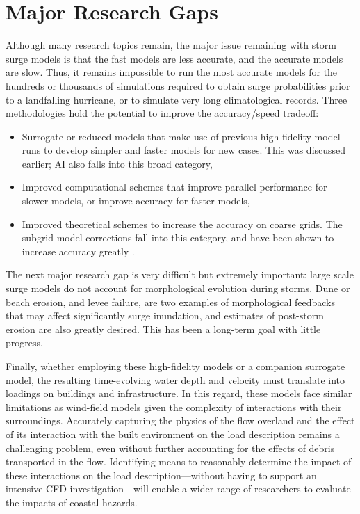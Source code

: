 \section{Major Research Gaps}
\label{sec:storm_surge_gaps}

Although many research topics remain, the major issue remaining with storm surge models is that the fast models are less accurate, and the accurate models are slow. Thus, it remains impossible to run the most accurate models for the hundreds or thousands of simulations required to obtain surge probabilities prior to a landfalling hurricane, or to simulate very long climatological records. Three methodologies hold the potential to improve the accuracy/speed tradeoff:

\begin{itemize}
    \item Surrogate or reduced models that make use of previous high fidelity model runs to develop simpler and faster models for new cases. This was discussed earlier; AI also falls into this broad category,
    \item Improved computational schemes that improve parallel performance for slower models, or improve accuracy for faster models,
    \item Improved theoretical schemes to increase the accuracy on coarse grids. The subgrid model corrections fall into this category, and have been shown to increase accuracy greatly \citep{kennedy2019subgrid}.
\end{itemize}

The next major research gap is very difficult but extremely important: large scale surge models do not account for morphological evolution during storms. Dune or beach erosion, and levee failure, are two examples of morphological feedbacks that may affect significantly surge inundation, and estimates of post-storm erosion are also greatly desired. This has been a long-term goal with little progress.

Finally, whether employing these high-fidelity models or a companion surrogate model, the resulting time-evolving water depth and velocity must translate into loadings on buildings and infrastructure. In this regard, these models face similar limitations as wind-field models given the complexity of interactions with their surroundings. Accurately capturing the physics of the flow overland and the effect of its interaction with the built environment on the load description remains a challenging problem, even without further accounting for the effects of debris transported in the flow. Identifying means to reasonably determine the impact of these interactions on the load description—without having to support an intensive CFD investigation—will enable a wider range of researchers to evaluate the impacts of coastal hazards. 
 
